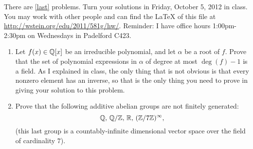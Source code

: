 \documentclass{article}
\title{\dred{Math 581e, Fall 2012, Homework 1}}
\author{William Stein ({\tt wstein@uw.edu})}
\date{Due: Friday, October 5, 2012}
\begin{document}
\maketitle

{\color{dbluecolor}There are \ref{last} problems. Turn your solutions in Friday, October
5, 2012 in class.  You may work with other people and can find the
\LaTeX{} of this file at \url{http://wstein.org/edu/2011/581g/hw/}.
Reminder: I have office hours 1:00pm-2:30pm on Wednesdays in Padelford
C423.}

\begin{enumerate}

\item Let $f(x) \in \mathbb{Q}[x]$ be an irreducible polynomial, and let $\alpha$ be a root of $f$.
Prove that the set of polynomial expressions in $\alpha$ of degree at most $\deg(f)-1$ 
is a field.  As I explained in class, the only thing that is not obvious is that
every nonzero element has an inverse, so that is the only thing you need to prove 
in giving your solution to this problem.   

\item\label{last} Prove that the following additive abelian groups are not finitely generated:
$$\mathbb{Q},\, \mathbb{Q}/\mathbb{Z},\, \mathbb{R},\, (\mathbb{Z}/7\mathbb{Z})^{\infty},$$ 
(this last group is a countably-infinite dimensional
vector space over the field of cardinality $7$).  

\end{enumerate}
\end{document}
